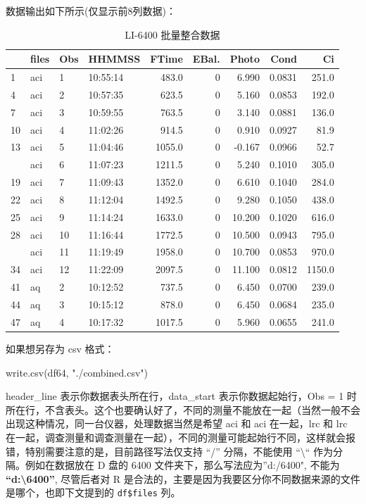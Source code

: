 \documentclass[
]{krantz}
\makeatletter
\newenvironment{Shaded}{\begin{snugshade}}{\end{snugshade}}
\newcommand{\FunctionTok}[1]{\textcolor[rgb]{0.00,0.00,0.00}{#1}}
\newcommand{\NormalTok}[1]{#1}
\newcommand{\StringTok}[1]{\textcolor[rgb]{0.31,0.60,0.02}{#1}}
\newenvironment{kframe}{%
\medskip{}
\setlength{\fboxsep}{.8em}
 \def\at@end@of@kframe{}%
 \ifinner\ifhmode%
  \def\at@end@of@kframe{\end{minipage}}%
  \begin{minipage}{\columnwidth}%
 \fi\fi%
 \def\FrameCommand##1{\hskip\@totalleftmargin \hskip-\fboxsep
 \colorbox{shadecolor}{##1}\hskip-\fboxsep
     \hskip-\linewidth \hskip-\@totalleftmargin \hskip\columnwidth}%
 \MakeFramed {\advance\hsize-\width
   \@totalleftmargin\z@ \linewidth\hsize
   \@setminipage}}%
 {\par\unskip\endMakeFramed%
 \at@end@of@kframe}
\renewenvironment{Shaded}{\begin{kframe}}{\end{kframe}}
\makeatother
\begin{document}
数据输出如下所示(仅显示前8列数据)：

\begin{table}

\caption{\label{tab:unnamed-chunk-5}LI-6400 批量整合数据}
\centering
\begin{tabular}[t]{llllrrrrr}
\toprule
  & files & Obs & HHMMSS & FTime & EBal. & Photo & Cond & Ci\\
\midrule
1 & aci & 1 & 10:55:14 & 483.0 & 0 & 6.990 & 0.0831 & 251.0\\
4 & aci & 2 & 10:57:35 & 623.5 & 0 & 5.160 & 0.0853 & 192.0\\
7 & aci & 3 & 10:59:55 & 763.5 & 0 & 3.140 & 0.0881 & 136.0\\
10 & aci & 4 & 11:02:26 & 914.5 & 0 & 0.910 & 0.0927 & 81.9\\
13 & aci & 5 & 11:04:46 & 1055.0 & 0 & -0.167 & 0.0966 & 52.7\\
\addlinespace
16 & aci & 6 & 11:07:23 & 1211.5 & 0 & 5.240 & 0.1010 & 305.0\\
19 & aci & 7 & 11:09:43 & 1352.0 & 0 & 6.610 & 0.1040 & 284.0\\
22 & aci & 8 & 11:12:04 & 1492.5 & 0 & 9.280 & 0.1050 & 438.0\\
25 & aci & 9 & 11:14:24 & 1633.0 & 0 & 10.200 & 0.1020 & 616.0\\
28 & aci & 10 & 11:16:44 & 1772.5 & 0 & 10.500 & 0.0943 & 795.0\\
\addlinespace
31 & aci & 11 & 11:19:49 & 1958.0 & 0 & 10.700 & 0.0853 & 970.0\\
34 & aci & 12 & 11:22:09 & 2097.5 & 0 & 11.100 & 0.0812 & 1150.0\\
41 & aq & 2 & 10:12:52 & 737.5 & 0 & 6.450 & 0.0700 & 239.0\\
44 & aq & 3 & 10:15:12 & 878.0 & 0 & 6.450 & 0.0684 & 235.0\\
47 & aq & 4 & 10:17:32 & 1017.5 & 0 & 5.960 & 0.0655 & 241.0\\
\bottomrule
\end{tabular}
\end{table}

如果想另存为 csv 格式：

\begin{Shaded}
\begin{Highlighting}[]
\FunctionTok{write.csv}\NormalTok{(df64, }\StringTok{"./combined.csv"}\NormalTok{)}
\end{Highlighting}
\end{Shaded}

header\_line 表示你数据表头所在行，data\_start 表示你数据起始行，Obs = 1 时所在行，不含表头。这个也要确认好了，不同的测量不能放在一起（当然一般不会出现这种情况，同一台仪器，处理数据当然是希望 aci 和 aci 在一起，lrc 和 lrc 在一起，调查测量和调查测量在一起），不同的测量可能起始行不同，这样就会报错，特别需要注意的是，目前路径写法仅支持 ``/'' 分隔，不能使用 ``\textbackslash`` 作为分隔。例如在数据放在 D 盘的 6400 文件夹下，那么写法应为''d:/6400", 不能为 \textbf{``d:\textbackslash6400''}, 尽管后者对 R 是合法的，主要是因为我要区分你不同数据来源的文件是哪个，也即下文提到的 \texttt{df\$files} 列。
\end{document}

